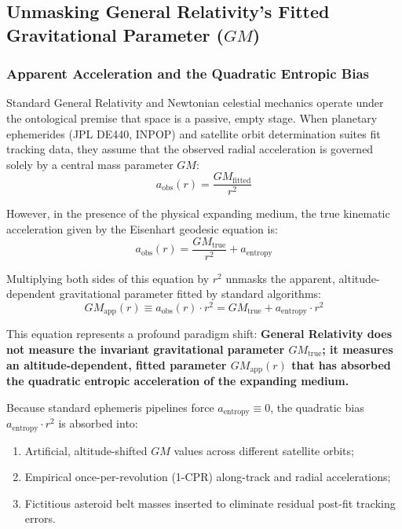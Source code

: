 \documentclass[11pt,a4paper]{article}
\begin{document}
\subsection{Unmasking General Relativity's Fitted Gravitational Parameter (\texorpdfstring{$GM$}{GM})}
\label{subsec:unmasking_gm}

\subsubsection{Apparent Acceleration and the Quadratic Entropic Bias}
\label{subsubsec:quadratic_entropic_bias}

Standard General Relativity and Newtonian celestial mechanics operate under the ontological premise that space is a passive, empty stage. When planetary ephemerides (JPL DE440, INPOP) and satellite orbit determination suites fit tracking data, they assume that the observed radial acceleration is governed solely by a central mass parameter $GM$:
\begin{equation}
a_{\text{obs}}(r) = \frac{GM_{\text{fitted}}}{r^2}
\end{equation}

However, in the presence of the physical expanding medium, the true kinematic acceleration given by the Eisenhart geodesic equation is:
\begin{equation}
a_{\text{obs}}(r) = \frac{GM_{\text{true}}}{r^2} + a_{\text{entropy}}
\end{equation}

Multiplying both sides of this equation by $r^2$ unmasks the apparent, altitude-dependent gravitational parameter fitted by standard algorithms:
\begin{equation}
GM_{\text{app}}(r) \equiv a_{\text{obs}}(r) \cdot r^2 = GM_{\text{true}} + a_{\text{entropy}} \cdot r^2
\label{eq:gm_unmasking}
\end{equation}

This equation represents a profound paradigm shift: \textbf{General Relativity does not measure the invariant gravitational parameter $GM_{\text{true}}$; it measures an altitude-dependent, fitted parameter $GM_{\text{app}}(r)$ that has absorbed the quadratic entropic acceleration of the expanding medium.}

Because standard ephemeris pipelines force $a_{\text{entropy}} \equiv 0$, the quadratic bias $a_{\text{entropy}} \cdot r^2$ is absorbed into:
\begin{enumerate}
    \item Artificial, altitude-shifted $GM$ values across different satellite orbits;
    \item Empirical once-per-revolution (1-CPR) along-track and radial accelerations;
    \item Fictitious asteroid belt masses inserted to eliminate residual post-fit tracking errors.
\end{enumerate}
\end{document}
